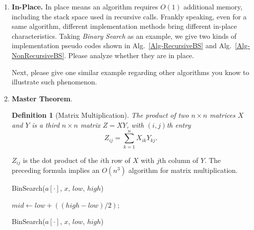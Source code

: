 \documentclass[12pt,a4paper]{article}
\newtheorem{definition}{Definition}
\theoremstyle{definition}
\begin{document}
\begin{enumerate}
\item \textbf{In-Place.} In place means an algorithm requires $O(1)$ additional memory, including the stack space used in recursive calls. Frankly speaking, even for a same algorithm, different implementation methods bring different in-place characteristics. Taking \emph{Binary Search} as an example, we give two kinds of implementation pseudo codes shown in Alg.~\ref{Alg-RecursiveBS} and Alg.~\ref{Alg-NonRecursiveBS}. Please analyze whether they are in place.
    
    Next, please give one similar example regarding other algorithms you know to illustrate such phenomenon.

\item  \textbf{Master Theorem}.

\begin{definition}[Matrix Multiplication]
The product of two $n \times n$ matrices $X$ and $Y$ is a third $n \times n$ matrix $Z = XY$, with $(i,j)$th entry
$$Z_{ij}=\sum_{k=1}^{n}X_{ik}Y_{kj}.$$
\end{definition}
$Z_{ij}$ is the dot product of the $i$th row of $X$ with $j$th column of $Y$. The preceding formula implies an $O(n^3)$ algorithm for matrix multiplication.

\begin{minipage}[t]{0.49\textwidth}
\begin{algorithm}[H]
	\BlankLine
	\caption{BinSearch($a[\cdot]$, $x$, $low$, $high$)} 
	\label{Alg-RecursiveBS}
	\BlankLine
    $mid \leftarrow low +((high - low) / 2)$;
    
    
\end{algorithm}
\end{minipage}
\begin{minipage}[t]{0.455\textwidth}
\begin{algorithm}[H]
\BlankLine
	\caption{BinSearch($a[\cdot]$, $x$, $low$, $high$)} \label{Alg-NonRecursiveBS}
		
	\BlankLine	
\end{algorithm}
\end{minipage}
\end{enumerate}
\end{document}
